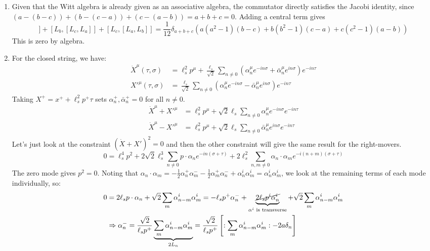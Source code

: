 \documentclass[11pt, class=article, crop=false]{standalone}
\begin{document}
\begin{enumerate}
%
%
%
% 
	 \item Given that the Witt algebra is already given as an associative algebra, the commutator directly satisfies the Jacobi identity, since $(a- (b-c)) + (b-(c-a)) + (c-(a-b)) = a+b+c = 0$. Adding a central term gives 
	 \begin{equation}
	 	[L_a, [L_b, L_c]] + [L_b, [L_c, L_a]] + [L_c, [L_a, L_b]] = \frac{1}{12} \delta_{a+b+c} (a(a^2-1) (b-c) + b(b^2-1) (c-a) + c(c^2-1) (a-b) )
	 \end{equation}
	 This is zero by algebra. 
	 
	 \item For the closed string, we have:
	 \[
	 \begin{aligned}
		\dot X^\mu(\tau, \sigma) &= \ell_s^2 p^\mu + \frac{\ell_s}{\sqrt 2} \sum_{n \neq 0} (\alpha_n^\mu e^{-in\sigma} + \bar \alpha_{n}^\mu e^{i n \sigma}) e^{- i n \tau}\\
		{X'}^\mu (\tau, \sigma) &= \frac{\ell_s}{\sqrt2} \sum_{n \neq 0} (\alpha_n^\mu e^{-in \sigma} - \bar \alpha_{n}^\mu e^{i n \sigma} ) e^{-in\tau}
	 \end{aligned}
	 \]
	 Taking $X^+ = x^+ + \ell_s^2 p^+ \tau$ sets $\alpha_n^+, \bar \alpha_n^+ = 0$ for all $n \neq 0$.
	 \[
	 \begin{aligned}
	 	\dot X^\mu + {X'}^\mu &= \ell_s^2 p^\mu + \sqrt2 \ell_s \sum_{n \neq 0} \alpha_n^\mu e^{-in\sigma} e^{-in\tau}\\
		\dot X^\mu - {X'}^\mu &= \ell_s^2 p^\mu + \sqrt2 \ell_s \sum_{n \neq 0} \bar \alpha_n^\mu e^{in\sigma} e^{-in\tau}
	 \end{aligned}
	 \]
	 Let's just look at the constraint $(\dot X + X')^2 = 0$ and then the other constraint will give the same result for the right-movers. 
	 \[
	 	0 = \ell_s^4 p^2 + 2\sqrt2 \ell_s^3 \sum_{n \neq 0} p \cdot \alpha_n e^{-in (\sigma + \tau)} + 2 \ell_s^2 \sum_{n, m \neq 0} \alpha_n \cdot \alpha_m e^{-i(n+m) (\sigma+\tau)}
	 \]
	 The zero mode gives $p^2 = 0$. Noting that $\alpha_n \cdot \alpha_m = - \frac12 \alpha^+_{n} \alpha^-_m - \frac12 \alpha^+_{m} \alpha^-_n + \alpha^i_n \alpha^i_m = \alpha^i_n \alpha^i_m$, we look at the remaining terms of each mode individually, so:
	 \[
	 \begin{aligned}
	 	0 &= 2 \ell_s p \cdot \alpha_{n} + \sqrt2 \sum_{m} \alpha_{n-m}^i \alpha_m^i = - \ell_s p^+ \alpha_n^- +  \underbrace{\cancel{2 \ell_s p^i \alpha^i_n}}_{\alpha^i\text{ is transverse}} + \sqrt2 \sum_{m} \alpha_{n-m}^i \alpha_m^i\\
		& \Rightarrow \alpha_n^- = \frac{\sqrt{2}}{\ell_s p^+} \underbrace{\sum_{m} \alpha_{n-m}^i \alpha_m^i}_{2 L_n} = \frac{\sqrt{2}}{\ell_s p^+} \left[: \sum_{m} \alpha_{n-m}^i \alpha_m^i : - 2 a \delta_{n}\right]
	 \end{aligned}
	 \]
	 

\end{enumerate}
\end{document}
